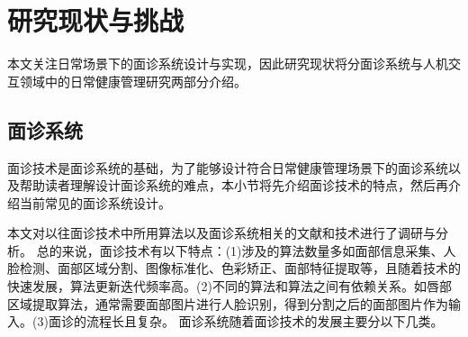\section{研究现状与挑战}
本文关注日常场景下的面诊系统设计与实现，因此研究现状将分面诊系统与人机交互领域中的日常健康管理研究两部分介绍。

\subsection{面诊系统}
\label{subsec:面诊系统}
面诊技术是面诊系统的基础，为了能够设计符合日常健康管理场景下的面诊系统以及帮助读者理解设计面诊系统的难点，本小节将先介绍面诊技术的特点，然后再介绍当前常见的面诊系统设计。

本文对以往面诊技术中所用算法以及面诊系统相关的文献和技术进行了调研与分析。
总的来说，面诊技术有以下特点：(1)涉及的算法数量多如面部信息采集、人脸检测、面部区域分割、图像标准化、色彩矫正、面部特征提取等\cite{宋海贝2018中医面诊信息自动识别方法研究进展}，且随着技术的快速发展，算法更新迭代频率高\cite{esteva2021deep}。(2)不同的算法和算法之间有依赖关系。如唇部区域提取算法，通常需要面部图片进行人脸识别，得到分割之后的面部图片作为输入\cite{Hu2016Robust}。(3)面诊的流程长且复杂\cite{林锋2019中医面诊系统调研报告}。
面诊系统随着面诊技术的发展主要分以下几类。

